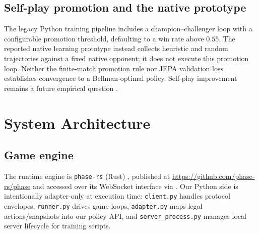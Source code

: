 \documentclass[11pt,a4paper]{article}
\theoremstyle{definition}
\theoremstyle{plain}
\begin{document}
\subsection{Self-play promotion and the native prototype}
The legacy Python training pipeline includes a champion--challenger loop with a configurable promotion threshold, defaulting to a win rate above $0.55$. The reported native learning prototype instead collects heuristic and random trajectories against a fixed native opponent; it does not execute this promotion loop. Neither the finite-match promotion rule nor JEPA validation loss establishes convergence to a Bellman-optimal policy. Self-play improvement remains a future empirical question \citep{tesauro1995temporal, silver2017mastering, silver2018alphazero, schrittwieser2020mastering}.

\section{System Architecture}
\label{sec:arch}

\subsection{Game engine}
The runtime engine is \texttt{phase-rs} (Rust) \citep{phase2026engine},
published at \url{https://github.com/phase-rs/phase} and accessed over its
WebSocket interface via .
Our Python side is intentionally adapter-only at execution time:
\texttt{client.py} handles protocol envelopes,
\texttt{runner.py} drives game loops,
\texttt{adapter.py} maps legal actions/snapshots into our policy API,
and \texttt{server\_process.py} manages local server lifecycle for
training scripts.
\end{document}
